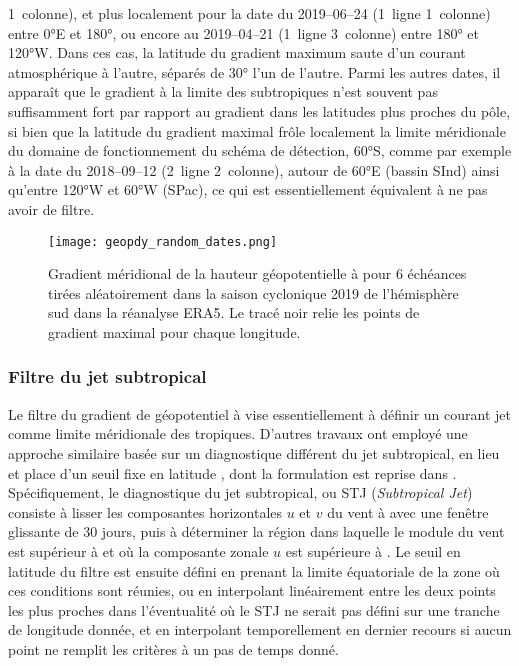 \documentclass[../main.tex]{subfiles}
\begin{document}
1\iere~colonne), et plus localement pour la date du 2019--06--24 (1\iere~ligne 1\iere~colonne) entre \ang{0}E et \ang{180}, ou encore au 2019--04--21
(1\iere~ligne 3\ieme~colonne) entre \ang{180} et \ang{120}W. Dans ces cas, la latitude du gradient maximum saute d'un courant atmosphérique à l'autre, séparés
de \ang{30} l'un de l'autre. Parmi les autres dates, il apparaît que le gradient à la limite des subtropiques n'est souvent pas suffisamment fort par rapport au
gradient dans les latitudes plus proches du pôle, si bien que la latitude du gradient maximal frôle localement la limite méridionale du domaine de
fonctionnement du schéma de détection, \ang{60}S, comme par exemple à la date du 2018--09--12 (2\ieme~ligne 2\ieme~colonne), autour de \ang{60}E (bassin SInd)
ainsi qu'entre \ang{120}W et \ang{60}W (SPac), ce qui est essentiellement équivalent à ne pas avoir de filtre.
%
\begin{figure}[tb]
    \centering
    \texttt{[image: geopdy\_random\_dates.png]}
    \caption{Gradient méridional de la hauteur géopotentielle à  pour 6 échéances tirées aléatoirement dans la saison cyclonique 2019 de l'hémisphère
    sud dans la réanalyse ERA5. Le tracé noir relie les points de gradient maximal pour chaque longitude.}
    \label{fig:geopdy_random}
\end{figure}

\subsubsection*{Filtre du jet subtropical}

Le filtre du gradient de géopotentiel à  vise essentiellement à définir un courant jet comme limite méridionale des tropiques. D'autres travaux ont
employé une approche similaire basée sur un diagnostique différent du jet subtropical, en lieu et place d'un seuil fixe en latitude
\parencite{tory_projected_2013,tory_sea_2015,bell_statistical_2018}, dont la formulation est reprise dans \textcite{bourdin_intercomparison_2022}.
Spécifiquement, le diagnostique du jet subtropical, ou STJ (\textit{Subtropical Jet}) consiste à lisser les composantes horizontales $u$ et $v$ du vent à
 avec une fenêtre glissante de 30 jours, puis à déterminer la région dans laquelle le module du vent est supérieur à  et où la composante zonale
$u$ est supérieure à . Le seuil en latitude du filtre est ensuite défini en prenant la limite équatoriale de la zone où ces conditions sont réunies, ou
en interpolant linéairement entre les deux points les plus proches dans l'éventualité où le STJ ne serait pas défini sur une tranche de longitude donnée, et en
interpolant temporellement en dernier recours si aucun point ne remplit les critères à un pas de temps donné. 
\end{document}

